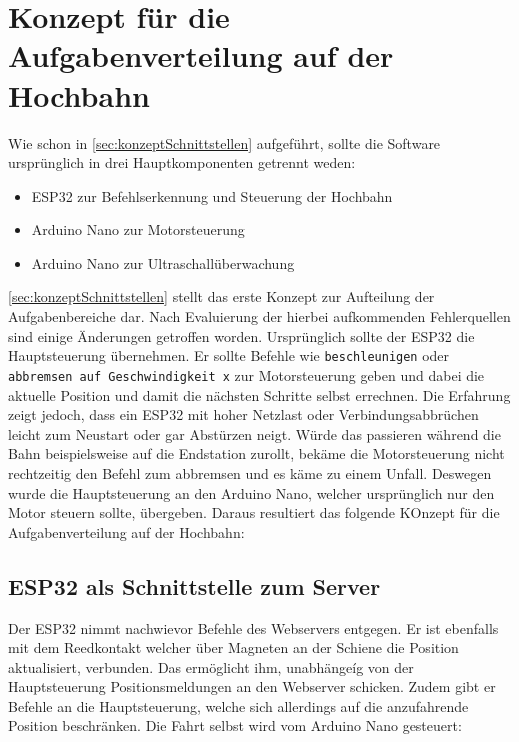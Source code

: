 \section{Konzept für die Aufgabenverteilung auf der Hochbahn}
\label{sec:hochbahnAlsClient}
Wie schon in \autoref{sec:konzeptSchnittstellen} aufgeführt, sollte die Software ursprünglich in drei Hauptkomponenten getrennt weden:
\begin{itemize}
	\item ESP32 zur Befehlserkennung und Steuerung der Hochbahn
	\item Arduino Nano zur Motorsteuerung
	\item Arduino Nano zur Ultraschallüberwachung %
\end{itemize}
\autoref{sec:konzeptSchnittstellen} stellt das erste Konzept zur Aufteilung der Aufgabenbereiche dar. Nach Evaluierung der hierbei aufkommenden Fehlerquellen sind einige Änderungen getroffen worden.
Ursprünglich sollte der ESP32 die Hauptsteuerung übernehmen. Er sollte Befehle wie \texttt{beschleunigen} oder \texttt{abbremsen auf Geschwindigkeit x} zur Motorsteuerung geben und dabei die aktuelle Position und damit die nächsten Schritte selbst errechnen. Die Erfahrung zeigt jedoch, dass ein ESP32 mit hoher Netzlast oder Verbindungsabbrüchen leicht zum Neustart oder gar Abstürzen neigt. Würde das passieren während die Bahn beispielsweise auf die Endstation zurollt, bekäme die Motorsteuerung nicht rechtzeitig den Befehl zum abbremsen und es käme zu einem Unfall.
Deswegen wurde die Hauptsteuerung an den Arduino Nano, welcher ursprünglich nur den Motor steuern sollte, übergeben. Daraus resultiert das folgende KOnzept für die Aufgabenverteilung auf der Hochbahn:

\subsection{ESP32 als Schnittstelle zum Server}
\label{sec:aufgabeESP}
Der ESP32 nimmt nachwievor Befehle des Webservers entgegen. Er ist ebenfalls mit dem Reedkontakt welcher über Magneten an der Schiene die Position aktualisiert, verbunden. Das ermöglicht ihm, unabhängeíg von der Hauptsteuerung Positionsmeldungen an den Webserver schicken. Zudem gibt er Befehle an die Hauptsteuerung, welche sich allerdings auf die anzufahrende Position beschränken. Die Fahrt selbst wird vom Arduino Nano gesteuert:

